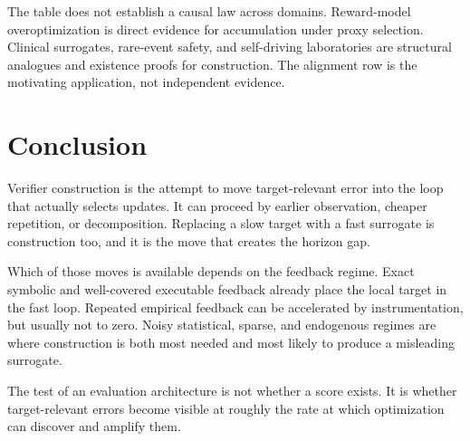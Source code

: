 \documentclass[11pt]{article}
\begin{document}
The table does not establish a causal law across domains. Reward-model overoptimization is direct evidence for accumulation under proxy selection. Clinical surrogates, rare-event safety, and self-driving laboratories are structural analogues and existence proofs for construction. The alignment row is the motivating application, not independent evidence.

\section{Conclusion}

Verifier construction is the attempt to move target-relevant error into the loop that actually selects updates. It can proceed by earlier observation, cheaper repetition, or decomposition. Replacing a slow target with a fast surrogate is construction too, and it is the move that creates the horizon gap.

Which of those moves is available depends on the feedback regime. Exact symbolic and well-covered executable feedback already place the local target in the fast loop. Repeated empirical feedback can be accelerated by instrumentation, but usually not to zero. Noisy statistical, sparse, and endogenous regimes are where construction is both most needed and most likely to produce a misleading surrogate.

The test of an evaluation architecture is not whether a score exists. It is whether target-relevant errors become visible at roughly the rate at which optimization can discover and amplify them.

\printbibliography
\end{document}
